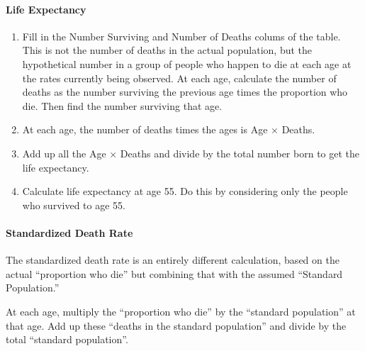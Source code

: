 \documentclass{article}
\begin{document}
\paragraph{Life Expectancy}
\begin{enumerate}
\item Fill in the Number Surviving and Number of Deaths colums of the table.  This is not the number of deaths in the actual population, but the hypothetical number in a group of people who happen to die at each age at the rates currently being observed.   At each age, calculate the number of deaths as the number surviving the previous age times the proportion who die.  Then find the number surviving that age.  

\item At each age, the number of deaths times the ages is Age $\times$ Deaths.

\item Add up all the Age $\times$ Deaths and divide by the total number born to get the life expectancy.

\item Calculate life expectancy at age 55.  Do this by considering only the people who survived to age 55.

\end{enumerate}

\bigskip
\paragraph{Standardized Death Rate}


The standardized death rate is an entirely different calculation,
based on the actual ``proportion who die'' but combining that with the
assumed ``Standard Population.''

At each age, multiply the ``proportion who die'' by the ``standard
population'' at that age.  Add up these ``deaths in the standard population'' and divide by the total
``standard population''.
\end{document}
